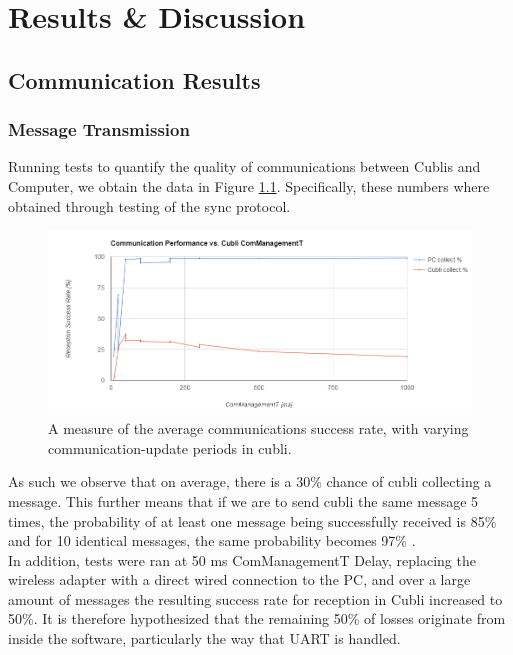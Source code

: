 \chapter{Results \& Discussion}\label{sec:results}

\section{Communication Results}

\subsection{Message Transmission}

Running tests to quantify the quality of communications between Cublis and Computer, we obtain the data in Figure \ref{img:comStats}. Specifically, these numbers where obtained through testing of the sync protocol.

\begin{figure}[ht]
   \centering
   \includegraphics[width=1\textwidth]{img/comStats.png}
   \caption{A measure of the average communications success rate, with varying communication-update periods in cubli.}
   \label{img:comStats}
\end{figure}

As such we observe that on average, there is a 30\% chance of cubli collecting a message. This further means that if we are to send cubli the same message 5 times, the probability of at least one message being successfully received is 85\% and for 10 identical messages, the same probability becomes 97\% .\\

In addition, tests were ran at 50 ms ComManagementT Delay, replacing the wireless adapter with a direct wired connection to the PC, and over a large amount of messages the resulting success rate for reception in Cubli increased to 50\%. It is therefore hypothesized that the remaining 50\% of losses originate from inside the software, particularly the way that UART is handled.\\

